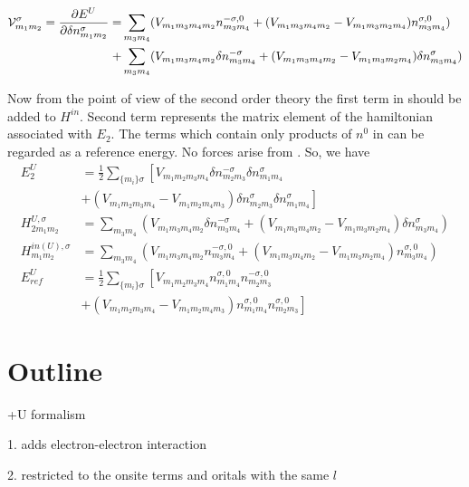 \begin{equation}
\label{hamU}
\begin{split}
\mathcal{V}_{m_1m_2}^{\sigma}=\frac{\partial E^U}{\partial \delta n_{m_1m_2}^{\sigma}}=&\sum_{m_3m_4}(V_{m_1m_3m_4m_2}
n_{m_3m_4}^{-\sigma,0}+(V_{m_1m_3m_4m_2}-V_{m_1m_3m_2m_4})n_{m_3m_4}^{\sigma,0})\\
+&\sum_{m_3m_4}(V_{m_1m_3m_4m_2}
\delta n_{m_3m_4}^{-\sigma}+(V_{m_1m_3m_4m_2}-V_{m_1m_3m_2m_4})\delta n_{m_3m_4}^{\sigma})
\end{split}
\end{equation}
%
\par{Now from the point of view of the second order theory the first term in  should be added to $H^{in}$.
Second term represents the matrix element of the hamiltonian 
associated with $E_2$. The terms which contain only products of $n^0$ in  can be regarded as a reference energy. No forces arise from . So, we have}
%
\begin{equation}
\begin{split}
E_{2}^{U}&=\frac{1}{2}\sum_{\{m_i\}\sigma}\left [V_{m_1m_2m_3m_4}\delta n_{m_2m_3}^{-\sigma}\delta n_{m_1m_4}^{\sigma}\right. \\&\left.+
(V_{m_1m_2m_3m_4}-V_{m_1m_2m_4m_3})
\delta n_{m_2m_3}^{\sigma}\delta n_{m_1m_4}^{\sigma}\right]\\
H^{U,\sigma}_{2m_1m_2}&=\sum_{m_3m_4}(V_{m_1m_3m_4m_2}
\delta n_{m_3m_4}^{-\sigma}+(V_{m_1m_3m_4m_2}-V_{m_1m_3m_2m_4})\delta n_{m_3m_4}^{\sigma})\\
H^{in(U), \sigma}_{m_1m_2}&=\sum_{m_3m_4}(V_{m_1m_3m_4m_2}
n_{m_3m_4}^{-\sigma,0}+(V_{m_1m_3m_4m_2}-V_{m_1m_3m_2m_4})n_{m_3m_4}^{\sigma,0})\\
E^{U}_{ref}&=\frac{1}{2}\sum_{\{m_i\}\sigma}\left[V_{m_1m_2m_3m_4}n_{m_1m_4}^{\sigma, 0}n_{m_2m_3}^{-\sigma,0}\right. \\ &\left.+(V_{m_1m_2m_3m_4}-V_{m_1m_2m_4m_3})
n_{m_1m_4}^{\sigma, 0}n_{m_2m_3}^{\sigma,0}\right]
\end{split}
\end{equation}
%
\section{Outline}
+U formalism
\par{1. adds electron-electron interaction}
\par{2. restricted to the onsite terms and oritals with the same $l$}
